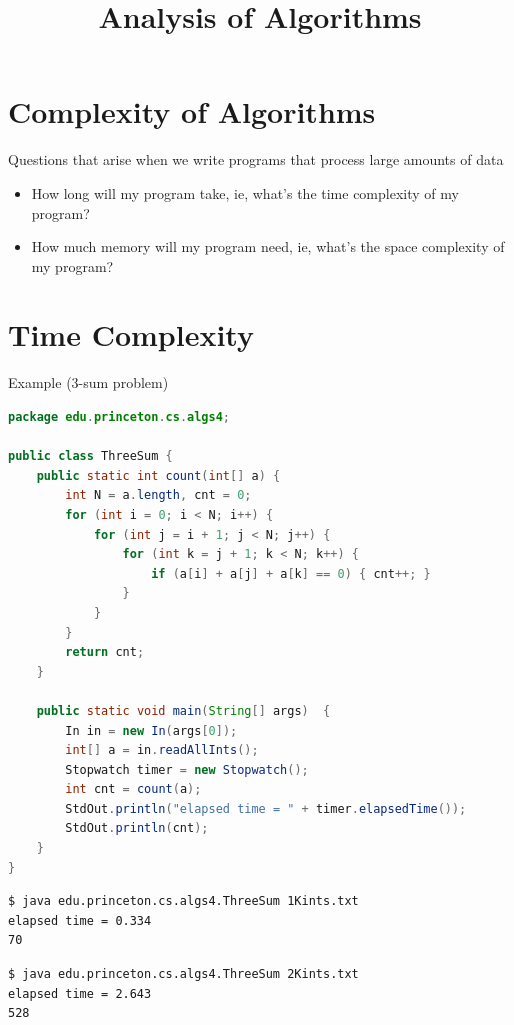 \documentclass[8pt,a4paper,compress]{beamer}
\title{Analysis of Algorithms}
\date{}
\begin{document}
\begin{frame}
\vfill
\titlepage
\end{frame}

\section{Complexity of Algorithms}
\begin{frame}[fragile]
\pause

Questions that arise when we write programs that process large amounts of data
\begin{itemize}
\pause
\item How long will my program take, ie, what's the time complexity of my program?

\pause
\item How much memory will my program need, ie, what's the space complexity of my program?
\end{itemize}
\end{frame}

\section{Time Complexity}
\begin{frame}[fragile]
\pause

Example (3-sum problem)
\begin{lstlisting}[language=Java,style=focusin]
package edu.princeton.cs.algs4;

public class ThreeSum {
    public static int count(int[] a) {
        int N = a.length, cnt = 0;
        for (int i = 0; i < N; i++) {
            for (int j = i + 1; j < N; j++) {
                for (int k = j + 1; k < N; k++) {
                    if (a[i] + a[j] + a[k] == 0) { cnt++; }
                }
            }
        }
        return cnt;
    }
    
    public static void main(String[] args)  { 
        In in = new In(args[0]);
        int[] a = in.readAllInts();
        Stopwatch timer = new Stopwatch();
        int cnt = count(a);
        StdOut.println("elapsed time = " + timer.elapsedTime());
        StdOut.println(cnt);
    } 
}
\end{lstlisting}

\pause\smallskip

\begin{lstlisting}[language={},style=focusin]
$ java edu.princeton.cs.algs4.ThreeSum 1Kints.txt 
elapsed time = 0.334
70
\end{lstlisting}

\pause\smallskip

\begin{lstlisting}[language={},style=focusin]
$ java edu.princeton.cs.algs4.ThreeSum 2Kints.txt 
elapsed time = 2.643
528
\end{lstlisting}
\end{frame}
\end{document}
